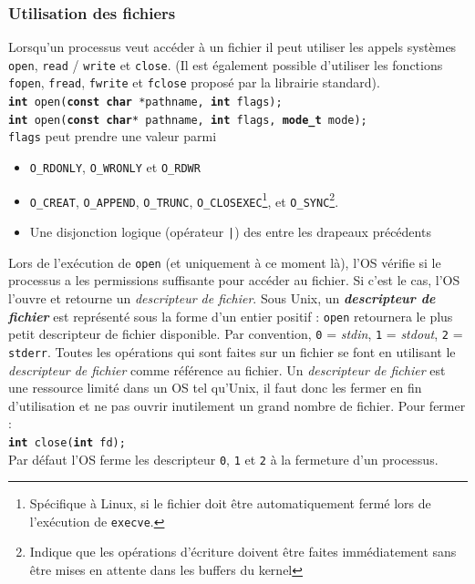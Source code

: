 \subsubsection{Utilisation des fichiers}
Lorsqu'un processus veut accéder à un fichier il peut utiliser les appels systèmes \texttt{open}, \texttt{read} / \texttt{write} et \texttt{close}. (Il est également possible d'utiliser les fonctions \texttt{fopen}, \texttt{fread}, \texttt{fwrite} et \texttt{fclose} proposé par la librairie standard). \\
\texttt{\textbf{int} open(\textbf{const char} *pathname, \textbf{int} flags); \\
\textbf{int} open(\textbf{const char}* pathname, \textbf{int} flags, \textbf{mode\_t} mode);} \\
\texttt{flags} peut prendre une valeur parmi
\begin{itemize}
  \item \texttt{O\_RDONLY}, \texttt{O\_WRONLY} et \texttt{O\_RDWR}
  \item \texttt{O\_CREAT}, \texttt{O\_APPEND}, \texttt{O\_TRUNC}, \texttt{O\_CLOSEXEC}\footnote{Spécifique à Linux, si le fichier doit être automatiquement fermé lors de l'exécution de \texttt{execve}.}, et \texttt{O\_SYNC}\footnote{Indique que les opérations d'écriture doivent être faites immédiatement sans être mises en attente dans les buffers du kernel}.
  \item Une disjonction logique (opérateur \texttt{|}) des entre les drapeaux précédents
\end{itemize}
Lors de l'exécution de \texttt{open} (et uniquement à ce moment là), l'OS vérifie si le processus a les permissions suffisante pour accéder au fichier. Si c'est le cas, l'OS l'ouvre et retourne un \textit{descripteur de fichier}. Sous Unix, un \textbf{\textit{descripteur de fichier}} est représenté sous la forme d'un entier positif : \texttt{open} retournera le plus petit descripteur de fichier disponible. Par convention, \texttt{0} = \textit{stdin}, \texttt{1} = \textit{stdout}, \texttt{2} = \texttt{stderr}. Toutes les opérations qui sont faites sur un fichier se font en utilisant le \textit{descripteur de fichier} comme référence au fichier. Un \textit{descripteur de fichier} est une ressource limité dans un OS tel qu'Unix, il faut donc les fermer en fin d'utilisation et ne pas ouvrir inutilement un grand nombre de fichier. Pour fermer : \\
\texttt{\textbf{int} close(\textbf{int} fd);}\\
Par défaut l'OS ferme les descripteur \texttt{0}, \texttt{1} et \texttt{2} à la fermeture d'un processus. \\

